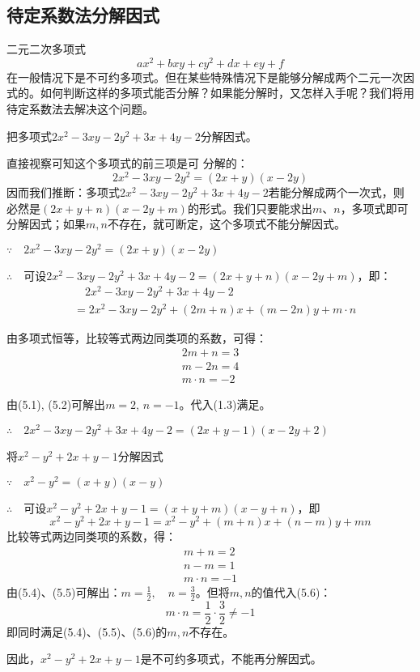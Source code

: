 \subsection{待定系数法分解因式}
二元二次多项式
\[ax^2+bxy+cy^2+dx+ey+f\]
在一般情况下是不可约多项式。但在某些特殊情况下是能够分解成两个二元一次因式的。如何判断这样的多项式能否分解？如果能分解时，又怎样入手呢？我们将用待定系数法去解决这个问题。



\begin{example}
    把多项式$2x^2-3xy-2y^2+3x+4y-2$分解因式。
\end{example}

\begin{analyze}
   直接视察可知这个多项式的前三项是可
    分解的：$$2x^2-3xy-2y^2=(2x+y)(x-2y)$$
 因而我们推断：多项式$2x^2-3xy-2y^2+3x+4y-2$若能分解成两个一次式，则必然是$(2x+y+n)(x-2y+m)$的形式。我们只要能求出$m$、$n$，多项式即可分解因式；如果$m, n$不存在，就可断定，这个多项式不能分解因式。   
\end{analyze}

\begin{solution}
$\because\quad 2x^2-3xy-2y^2=(2x+y)(x-2y)$

$\therefore\quad $可设$2x^2-3xy-2y^2+3x+4y-2=(2x+y+n)(x-2y+m)$，即：
\[\begin{split}
   &\quad 2x^2-3xy-2y^2+3x+4y-2\\
   &=2x^2-3xy-2y^2+(2m+n)x+(m-2n)y+m\cdot n 
\end{split}\]

由多项式恒等，比较等式两边同类项的系数，可得：
\begin{align}
        2m+n=3\\
        m-2n=4\\
        m\cdot n=-2
\end{align}

由(5.1), (5.2)可解出$m=2$, $n=-1$。代入(1.3)满足。

$\therefore\quad 2x^2-3xy-2y^2+3x+4y-2=(2x+y-1) (x-2y+2)$
\end{solution}


\begin{example}
    将$x^2-y^2+2x+y-1$分解因式
\end{example}


\begin{solution}
    $\because\quad x^2-y^2=(x+y)(x-y)$

$\therefore\quad $可设$x^2-y^2+2x+y-1=(x+y+m) (x-y+n)$，即
\[x^2-y^2+2x+y-1=x^2-y^2+ (m+n) x+ (n-m) y+mn\]
    比较等式两边同类项的系数，得：    
\begin{align}
    m+n=2\\
    n-m=1\\
    m\cdot n=-1
\end{align}
由(5.4)、(5.5)可解出：$m=\frac{1}{2},\quad n=\frac{3}{2}$。但将$m,n$的值代入(5.6)：
\[m\cdot n=\frac{1}{2}\cdot\frac{3}{2}\ne -1\]
即同时满足(5.4)、(5.5)、(5.6)的$m,n$不存在。

因此，$x^2-y^2+2x+y-1$是不可约多项式，不能再分解因式。
\end{solution}


